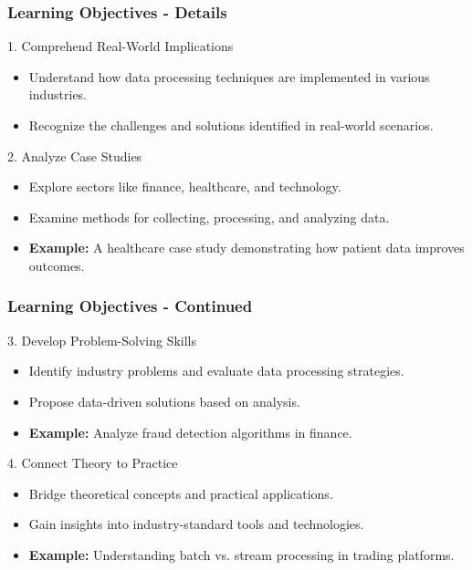 \documentclass{beamer}
\begin{document}
\begin{frame}[fragile]
    \frametitle{Learning Objectives - Details}
    \begin{block}{1. Comprehend Real-World Implications}
        \begin{itemize}
            \item Understand how data processing techniques are implemented in various industries.
            \item Recognize the challenges and solutions identified in real-world scenarios.
        \end{itemize}
    \end{block}

    \begin{block}{2. Analyze Case Studies}
        \begin{itemize}
            \item Explore sectors like finance, healthcare, and technology.
            \item Examine methods for collecting, processing, and analyzing data.
            \item \textbf{Example:} A healthcare case study demonstrating how patient data improves outcomes.
        \end{itemize}
    \end{block}
\end{frame}

\begin{frame}[fragile]
    \frametitle{Learning Objectives - Continued}
    \begin{block}{3. Develop Problem-Solving Skills}
        \begin{itemize}
            \item Identify industry problems and evaluate data processing strategies.
            \item Propose data-driven solutions based on analysis.
            \item \textbf{Example:} Analyze fraud detection algorithms in finance.
        \end{itemize}
    \end{block}

    \begin{block}{4. Connect Theory to Practice}
        \begin{itemize}
            \item Bridge theoretical concepts and practical applications.
            \item Gain insights into industry-standard tools and technologies.
            \item \textbf{Example:} Understanding batch vs. stream processing in trading platforms.
        \end{itemize}
    \end{block}
\end{frame}
\end{document}
